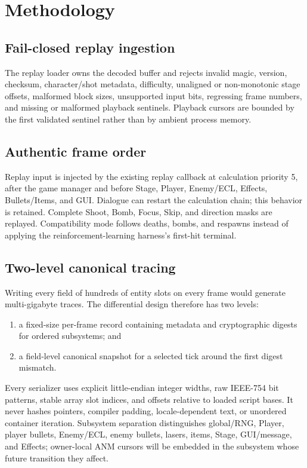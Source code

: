 \section{Methodology}

\subsection{Fail-closed replay ingestion}

The replay loader owns the decoded buffer and rejects invalid magic, version,
checksum, character/shot metadata, difficulty, unaligned or non-monotonic stage
offsets, malformed block sizes, unsupported input bits, regressing frame
numbers, and missing or malformed playback sentinels.  Playback cursors are
bounded by the first validated sentinel rather than by ambient process memory.

\subsection{Authentic frame order}

Replay input is injected by the existing replay callback at calculation
priority 5, after the game manager and before Stage, Player, Enemy/ECL,
Effects, Bullets/Items, and GUI.  Dialogue can restart the calculation chain;
this behavior is retained.  Complete Shoot, Bomb, Focus, Skip, and direction
masks are replayed.  Compatibility mode follows deaths, bombs, and respawns
instead of applying the reinforcement-learning harness's first-hit terminal.

\subsection{Two-level canonical tracing}

Writing every field of hundreds of entity slots on every frame would generate
multi-gigabyte traces.  The differential design therefore has two levels:

\begin{enumerate}
  \item a fixed-size per-frame record containing metadata and cryptographic
  digests for ordered subsystems; and
  \item a field-level canonical snapshot for a selected tick around the first
  digest mismatch.
\end{enumerate}

Every serializer uses explicit little-endian integer widths, raw IEEE-754 bit
patterns, stable array slot indices, and offsets relative to loaded script
bases.  It never hashes pointers, compiler padding, locale-dependent text, or
unordered container iteration.  Subsystem separation distinguishes global/RNG,
Player, player bullets, Enemy/ECL, enemy bullets, lasers, items, Stage,
GUI/message, and Effects; owner-local ANM cursors will be embedded in the
subsystem whose future transition they affect.

